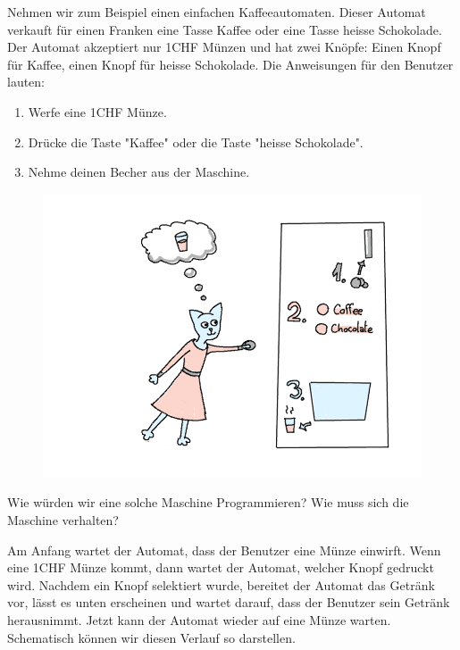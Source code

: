 \documentclass{article}
\begin{document}
Nehmen wir zum Beispiel einen einfachen Kaffeeautomaten. Dieser Automat verkauft für einen Franken eine Tasse Kaffee oder eine Tasse heisse Schokolade. Der Automat akzeptiert nur 1CHF Münzen und hat zwei Knöpfe: Einen Knopf für Kaffee, einen Knopf für heisse Schokolade. Die Anweisungen für den Benutzer lauten:

\begin{minipage}{0.4\linewidth}
\begin{enumerate}
\item Werfe eine 1CHF Münze.
\item Drücke die Taste "Kaffee" oder die Taste "heisse Schokolade".
\item Nehme deinen Becher aus der Maschine.
\end{enumerate}
\end{minipage} \hfill
\begin{minipage}{0.6\linewidth}
\begin{figure}[H]
\centering
\includegraphics[width=\linewidth]{Pictures/image.png}
\end{figure}
\end{minipage}



Wie würden wir eine solche Maschine Programmieren? Wie muss sich die Maschine verhalten?

Am Anfang wartet der Automat, dass der Benutzer eine Münze einwirft. Wenn eine 1CHF Münze kommt, dann wartet der Automat, welcher Knopf gedruckt wird. Nachdem ein Knopf selektiert wurde, bereitet der Automat das Getränk vor, lässt es unten erscheinen und wartet darauf, dass der Benutzer sein Getränk herausnimmt. Jetzt kann der Automat wieder auf eine Münze warten. Schematisch können wir diesen Verlauf so darstellen.
\end{document}
